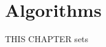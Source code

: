 \chapter{Algorithms}{}
\label{sec:algos}

\lettrine[lraise=0.1, nindent=0em, slope=-.5em]{T} {HIS CHAPTER} sets